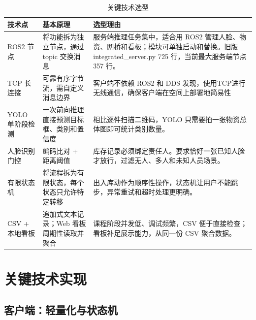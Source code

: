 \documentclass[12pt]{article}
\newcommand{\code}[1]{{\ttfamily #1}}
\begin{document}
\begin{table}[H]
	\centering
	\caption{关键技术选型}
	\label{tab:tech}
	\small
	\begin{tabularx}{\textwidth}{M{2.4cm}Y Y}
		\toprule
		技术点          & 基本原理                                   & 选型理由                                                                                                                                                \\
		\midrule
		ROS2 节点       & 将功能拆为独立节点，通过 topic 交换消息    & 服务端推理任务集中，适合用 ROS2 管理人脸、物资、网桥和看板；模块可单独启动和替换。旧版 \code{integrated\_server.py} 725 行，当前最大服务端节点 357 行。 \\
		TCP 长连接      & 可靠有序字节流，需自定义消息边界           & 客户端不依赖 ROS2 和 DDS 发现，使用TCP进行无线通信，确保客户端在空间上部署地简易性                                                           \\
		YOLO 单阶段检测 & 一次前向推理直接预测目标框、类别和置信度   & 相比逐件扫描二维码，YOLO 只需要拍一张物资总体图即可统计类别数量。                                                        \\
		人脸识别门控    & 编码比对 + 距离阈值                        & 库存记录必须绑定责任人。要求恰好一张已知人脸才放行，过滤无人、多人和未知人员场景。                                                                      \\
		有限状态机      & 将流程拆为有限状态，每个状态只允许特定转移 & 出入库动作为顺序性操作，状态机让用户不能跳步，异常重试和超时处理更明确。                                                                                \\
		CSV + 本地看板  & 追加式文本记录；Web 看板周期性读取并聚合   & 课程阶段并发低、调试频繁，CSV 便于直接检查；看板补足展示能力，从同一份 CSV 聚合数据。                                                                   \\
		\bottomrule
	\end{tabularx}
\end{table}

\section{关键技术实现}

\subsection{客户端：轻量化与状态机}
\end{document}
